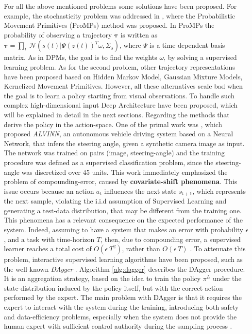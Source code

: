 For all the above mentioned problems some solutions have been proposed. For example, the stochasticity problem was addressed in \cite{paraschos2013ProMPs}, where the Probabilistic Movement Primitives (ProMPs) method was proposed. In ProMPs the probability of observing a trajectory $\boldsymbol{\tau}$ is written as $\boldsymbol{\tau} = \underset{t}{\prod} \ \mathcal{N}(s(t)|\Psi(z(t))^{T}\omega, \Sigma_{s})$, where $\Psi$ is a time-dependent basis matrix. As in DPMs, the goal is to find the weights $\omega$, by solving a supervised learning problem. As for the second problem, other trajectory representations have been proposed based on Hidden Markov Model, Gaussian Mixture Models, Kernelized Movement Primitives. However, all these alternatives scale bad when the goal is to learn a policy starting from visual observations. To handle such complex high-dimensional input Deep Architecture have been proposed, which will be explained in detail in the next sections.
\newline Regarding the methods that derive the policy in the action-space. One of the primal work was \cite{pomerleau1988alvinn}, which proposed \textit{ALVINN}, an autonomous vehicle driving system based on a Neural Network, that infers the steering angle, given a synthetic camera image as input. The network was trained on pairs (image, steering-angle) and the training procedure was defined as a supervised classification problem, since the steering-angle was discretized over 45 units. This work immediately emphasized the problem of compounding-error, caused by \textbf{covariate-shift phenomena}. This issue occurs because an action $a_{t}$ influences the next state $s_{t+1}$, which represents the next sample, violating the i.i.d assumption of Supervised Learning and generating a test-data distribution, that may be different from the training one. This phenomena has a relevant consequence on the expected performance of the system. Indeed, assuming to have a system that makes an error with probability $\epsilon$, and a task with time-horizon $T$, then, due to compounding error, a supervised learner reaches a total cost of $O(\epsilon \ T^{2})$, rather than $O(\epsilon \ T)$ \cite{ross2010efficient_reductions,ross2011dagger}. To attenuate this problem, interactive supervised learning algorithms have been proposed, such as the well-known \textit{DAgger} \cite{ross2011dagger}. Algorithm \ref{alg:dagger} describes the DAgger procedure. It is an aggregation strategy, based on the idea to train the policy $\pi^{L}$ under the state-distribution induced by the policy itself, but with the correct action performed by the expert. The main problem with DAgger is that it requires the expert to interact with the system during the training, introducing both safety and data-efficiency problems, especially when the system does not provide the human expert with sufficient control authority during the sampling process \cite{laskey2017comparing_hc_rc}. 
